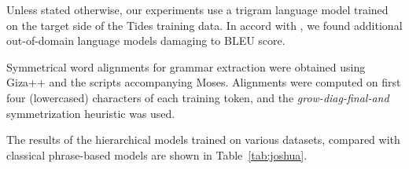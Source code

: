\documentclass[11pt]{article}
\def\Tref#1{Table~\ref{#1}}
\begin{document}
Unless stated otherwise, our experiments use a trigram language model trained on the
target side of the Tides training data. In accord with \citet{BoStEnglishHindiTranslation2008},
we found additional out-of-domain language models damaging to BLEU score.

Symmetrical word alignments for grammar extraction were obtained using Giza++
and the scripts accompanying Moses. Alignments were computed on first four
(lowercased) characters of each training token, and the \textit{grow-diag-final-and}
symmetrization heuristic was used.

The results of the hierarchical models trained on various datasets,
compared with classical phrase-based models are shown in \Tref{tab:joshua}.

\end{document}
